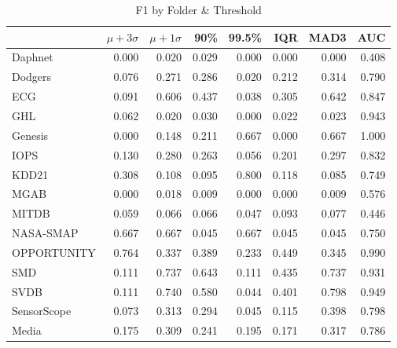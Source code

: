 \begin{table}
\caption{F1 by Folder \& Threshold}
\label{tab:f1_by_folder}
\begin{tabular}{lrrrrrrr}
\toprule
 & $\mu + 3\sigma$ & $\mu + 1\sigma$ & 90\% & 99.5\% & IQR & MAD3 & AUC \\
\midrule
Daphnet & 0.000 & 0.020 & 0.029 & 0.000 & 0.000 & 0.000 & 0.408 \\
Dodgers & 0.076 & 0.271 & 0.286 & 0.020 & 0.212 & 0.314 & 0.790 \\
ECG & 0.091 & 0.606 & 0.437 & 0.038 & 0.305 & 0.642 & 0.847 \\
GHL & 0.062 & 0.020 & 0.030 & 0.000 & 0.022 & 0.023 & 0.943 \\
Genesis & 0.000 & 0.148 & 0.211 & 0.667 & 0.000 & 0.667 & 1.000 \\
IOPS & 0.130 & 0.280 & 0.263 & 0.056 & 0.201 & 0.297 & 0.832 \\
KDD21 & 0.308 & 0.108 & 0.095 & 0.800 & 0.118 & 0.085 & 0.749 \\
MGAB & 0.000 & 0.018 & 0.009 & 0.000 & 0.000 & 0.009 & 0.576 \\
MITDB & 0.059 & 0.066 & 0.066 & 0.047 & 0.093 & 0.077 & 0.446 \\
NASA-SMAP & 0.667 & 0.667 & 0.045 & 0.667 & 0.045 & 0.045 & 0.750 \\
OPPORTUNITY & 0.764 & 0.337 & 0.389 & 0.233 & 0.449 & 0.345 & 0.990 \\
SMD & 0.111 & 0.737 & 0.643 & 0.111 & 0.435 & 0.737 & 0.931 \\
SVDB & 0.111 & 0.740 & 0.580 & 0.044 & 0.401 & 0.798 & 0.949 \\
SensorScope & 0.073 & 0.313 & 0.294 & 0.045 & 0.115 & 0.398 & 0.798 \\
Media & 0.175 & 0.309 & 0.241 & 0.195 & 0.171 & 0.317 & 0.786 \\
\bottomrule
\end{tabular}
\end{table}
